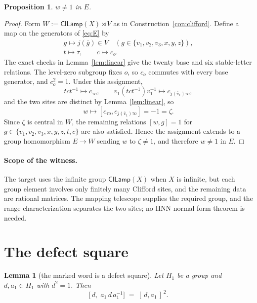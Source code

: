 \documentclass[11pt]{amsart}
\newcommand{\leanverified}[2]{\ignorespaces}
\newtheorem{proposition}[theorem]{Proposition}
\newtheorem{lemma}[theorem]{Lemma}
\theoremstyle{definition}
\theoremstyle{remark}
\theoremstyle{plain}
\newcommand{\ClLamp}{\mathsf{ClLamp}}
\begin{document}
\begin{proposition}\label{prop:witness}
$w\neq1$ in $E$.
\leanverified{Sofic/LiteralNonMFLinearWitness}{GroupApproximation.LiteralNonMFLinearWitness.literal_mark_ne_one}
\end{proposition}

\begin{proof}
Form $W:=\ClLamp(X)\rtimes V$ as in Construction~\ref{con:clifford}.
Define a map on the generators of \eqref{eq:E} by
\[
\begin{gathered}
  g\mapsto j(\bar g)\in V\quad
  (g\in\{v_1,v_2,v_3,x,y,z\}),\\
  t\mapsto\tau,\qquad c\mapsto c_o .
\end{gathered}
\]
The exact checks in Lemma~\ref{lem:linear} give the twenty base and six
stable-letter relations.  The level-zero subgroup fixes $o$, so $c_o$
commutes with every base generator, and $c_o^2=1$.
Under this assignment,
\[
  tct^{-1}\mapsto c_{\tau o},\qquad
  v_1(tct^{-1})v_1^{-1}\mapsto c_{j(\bar v_1)\tau o},
\]
and the two sites are distinct by Lemma~\ref{lem:linear}, so
\[
  w\mapsto[c_{\tau o},c_{j(\bar v_1)\tau o}]=-1=\zeta .
\]
Since $\zeta$ is central in $W$, the remaining relations $[w,g]=1$ for
$g\in\{v_1,v_2,v_3,x,y,z,t,c\}$ are also satisfied.  Hence the
assignment extends to a group homomorphism $E\to W$ sending $w$ to
$\zeta\neq1$, and therefore $w\neq1$ in $E$.
\end{proof}

\paragraph{Scope of the witness.}
The target uses the infinite group $\ClLamp(X)$ when $X$ is
infinite, but each group element involves only finitely many Clifford
sites, and the remaining data are rational matrices.  The mapping
telescope supplies the required group, and the range characterization
separates the two sites; no HNN normal-form theorem is needed.
\section{The defect square}\label{sec:proofA}

\begin{lemma}[the marked word is a defect square]\label{lem:square}
Let $H_1$ be a group and $d,a_1\in H_1$ with $d^2=1$.  Then
\leanverified{Sofic/CompressionDefectSquare}{GroupApproximation.commutator_conjugate_eq_commutator_sq_of_sq_eq_one}
\[
  \bigl[\,d,\;a_1\,d\,a_1^{-1}\bigr]\;=\;[\,d,a_1\,]^{\,2} .
\]
\end{lemma}
\end{document}

